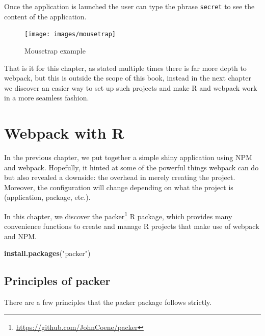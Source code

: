 \documentclass[10pt,]{krantz}
\makeatletter
\newenvironment{Shaded}{\begin{snugshade}}{\end{snugshade}}
\newcommand{\KeywordTok}[1]{\textcolor[rgb]{0.27,0.27,0.27}{\textbf{#1}}}
\newcommand{\NormalTok}[1]{#1}
\newcommand{\StringTok}[1]{\textcolor[rgb]{0.5,0.5,0.5}{#1}}
\renewcommand{\href}[2]{#2\footnote{\url{#1}}}
\newenvironment{kframe}{%
\medskip{}
\setlength{\fboxsep}{.8em}
 \def\at@end@of@kframe{}%
 \ifinner\ifhmode%
  \def\at@end@of@kframe{\end{minipage}}%
  \begin{minipage}{\columnwidth}%
 \fi\fi%
 \def\FrameCommand##1{\hskip\@totalleftmargin \hskip-\fboxsep
 \colorbox{shadecolor}{##1}\hskip-\fboxsep
     \hskip-\linewidth \hskip-\@totalleftmargin \hskip\columnwidth}%
 \MakeFramed {\advance\hsize-\width
   \@totalleftmargin\z@ \linewidth\hsize
   \@setminipage}}%
 {\par\unskip\endMakeFramed%
 \at@end@of@kframe}
\renewenvironment{Shaded}{\begin{kframe}}{\end{kframe}}
\makeatother
\begin{document}
Once the application is launched the user can type the phrase \texttt{secret} to see the content of the application.

\begin{figure}[H]

{\centering \texttt{[image: images/mousetrap]} 

}

\caption{Mousetrap example}\label{fig:mousetrap}
\end{figure}

That is it for this chapter, as stated multiple times there is far more depth to webpack, but this is outside the scope of this book, instead in the next chapter we discover an easier way to set up such projects and make R and webpack work in a more seamless fashion.

\hypertarget{packer-overview}{%
\chapter{Webpack with R}\label{packer-overview}}

In the previous chapter, we put together a simple shiny application using NPM and webpack. Hopefully, it hinted at some of the powerful things webpack can do but also revealed a downside: the overhead in merely creating the project. Moreover, the configuration will change depending on what the project is (application, package, etc.).

In this chapter, we discover the \href{https://github.com/JohnCoene/packer}{packer} \citep{R-packer} R package, which provides many convenience functions to create and manage R projects that make use of webpack and NPM.

\begin{Shaded}
\begin{Highlighting}[]
\KeywordTok{install.packages}\NormalTok{(}\StringTok{"packer"}\NormalTok{)}
\end{Highlighting}
\end{Shaded}

\hypertarget{packer-principles}{%
\section{Principles of packer}\label{packer-principles}}

There are a few principles that the packer package follows strictly.
\end{document}
